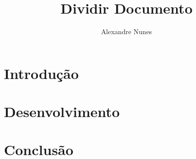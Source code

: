 \documentclass{article}
\begin{document}
	\title{\textbf{{\Huge Dividir Documento}}} %
	\author{Alexandre Nunes} %
	\date{} %
	\maketitle %
	\thispagestyle{empty} %
	\newpage
	
	\setcounter{page}{1} %
	\tableofcontents %
	\newpage

	\setcounter{page}{1} %
	
	\section{Introdução}
	
	\section{Desenvolvimento}
	
	\section{Conclusão}
	

	
	
\end{document}
